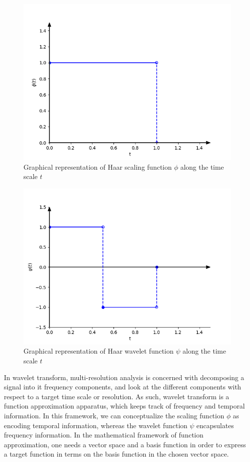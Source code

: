 \documentclass[../Main/thesis.tex]{subfiles}
\begin{document}
\begin{figure}[H] %
   \centering
   \includegraphics[width=5in]{../fig/haar-phi.png} 
   \caption{Graphical representation of Haar scaling function $\phi$ along the time scale $t$}
   \label{fig:haar-phi}
\end{figure}
\begin{figure}[H] %
   \centering
   \includegraphics[width=5in]{../fig/haar-psi.png} 
   \caption{Graphical representation of Haar wavelet function $\psi$ along the time scale $t$}
   \label{fig:haar-psi}
\end{figure}
\clearpage
\justify
In wavelet transform, multi-resolution analysis is concerned with decomposing a signal into it frequency components, and look at the different components with respect to a target time scale or resolution. As such, wavelet transform is a function approximation apparatus, which keeps track of frequency and temporal information. In this framework, we can conceptualize the scaling function $\phi$ as encoding temporal information, whereas the wavelet function $\psi$ encapsulates frequency information. In the mathematical framework of function approximation, one needs a vector space and a basis function in order to express a target function in terms on the basis function in the chosen vector space.
\end{document}
